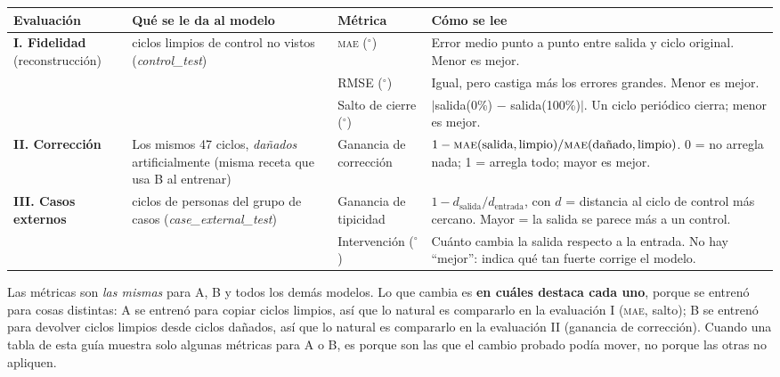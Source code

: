 \documentclass[11pt,a4paper]{article}
\newcommand{\gr}{$^\circ$}
\newcommand{\mae}{\textsc{mae}}
\begin{document}
\begin{center}
\footnotesize
\begin{tabularx}{\textwidth}{@{}>{\raggedright\arraybackslash}p{2.2cm}>{\raggedright\arraybackslash}p{3.0cm}>{\raggedright\arraybackslash}p{2.8cm}>{\raggedright\arraybackslash}X@{}}
\toprule
\textbf{Evaluación} & \textbf{Qué se le da al modelo} & \textbf{Métrica} & \textbf{Cómo se lee} \\
\midrule
\textbf{I. Fidelidad} (reconstrucción) & 47 ciclos limpios de control no vistos (\emph{control\_test}) & \mae{} (\gr) & Error medio punto a punto entre salida y ciclo original. Menor es mejor. \\
 & & RMSE (\gr) & Igual, pero castiga más los errores grandes. Menor es mejor. \\
 & & Salto de cierre (\gr) & $|$salida(0\%) $-$ salida(100\%)$|$. Un ciclo periódico cierra; menor es mejor. \\
\midrule
\textbf{II. Corrección} & Los mismos 47 ciclos, \emph{dañados} artificialmente (misma receta que usa B al entrenar) & Ganancia de corrección & $1-\mae(\text{salida},\text{limpio})/\mae(\text{dañado},\text{limpio})$. 0 = no arregla nada; 1 = arregla todo; mayor es mejor. \\
\midrule
\textbf{III. Casos externos} & 130 ciclos de personas del grupo de casos (\emph{case\_external\_test}) & Ganancia de tipicidad & $1-d_{\text{salida}}/d_{\text{entrada}}$, con $d$ = distancia al ciclo de control más cercano. Mayor = la salida se parece más a un control. \\
 & & Intervención (\gr) & Cuánto cambia la salida respecto a la entrada. No hay ``mejor'': indica qué tan fuerte corrige el modelo. \\
\bottomrule
\end{tabularx}
\end{center}

\begin{intuicion}
Las métricas son \emph{las mismas} para A, B y todos los demás modelos. Lo que cambia es \textbf{en cuáles destaca cada uno}, porque se entrenó para cosas distintas: A se entrenó para copiar ciclos limpios, así que lo natural es compararlo en la evaluación I (\mae{}, salto); B se entrenó para devolver ciclos limpios desde ciclos dañados, así que lo natural es compararlo en la evaluación II (ganancia de corrección). Cuando una tabla de esta guía muestra solo algunas métricas para A o B, es porque son las que el cambio probado podía mover, no porque las otras no apliquen.
\end{intuicion}
\end{document}
